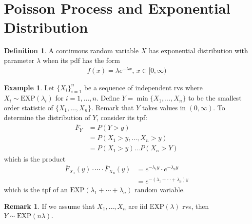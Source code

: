 \documentclass[11pt]{amsart}
\theoremstyle{definition}
\newtheorem{definition}[theorem]{Definition}
\newtheorem{remark}[theorem]{Remark}
\newtheorem{example}[theorem]{Example}
\numberwithin{equation}{section}
\begin{document}
 \section{Poisson Process and Exponential Distribution}
 \begin{definition}
     A continuous random variable $X$ has exponential distribution with parameter $\lambda$ when its pdf has the form
     \begin{align*}
         f(x)=\lambda e^{-\lambda x},\, x\in[0,\infty)
     \end{align*}
 \end{definition}
 \begin{example}
     Let $\{X_i\}_{i=1}^n$ be a sequence of independent rvs where $X_i\sim \mathrm{EXP}(\lambda_i)$ for $i=1,\ldots,n$. Define $Y=\min\{X_1,\ldots,X_n\}$ to be the smallest order statistic of $\{X_1,\ldots,X_n\}$. Remark that $Y$ takes values in $(0,\infty)$. To determine the distribution of $Y$, consider its tpf:
     \begin{align*}
         \overline{F}_Y&=P(Y>y)\\
         &=P(X_1>y,\ldots,X_n>y)\\
         &=P(X_1>y)\ldots P(X_n>Y)
     \end{align*}
     which is the product
     \begin{align*}
         \overline{F}_{X_1}(y)\cdot\cdots\cdot\overline{F}_{X_n}(y)&=e^{-\lambda_1y}\cdot e^{-\lambda_ny}\\
         &=e^{-(\lambda_1+\cdots+\lambda_n)y}
     \end{align*}
     which is the tpf of an $\mathrm{EXP}(\lambda_1+\cdots+\lambda_n)$ random variable.
 \end{example}
 \begin{remark}
     If we assume that $X_1,\ldots,X_n$ are iid $\mathrm{EXP}(\lambda)$ rvs, then $Y\sim\mathrm{EXP}(n\lambda)$.
 \end{remark}
\end{document}
